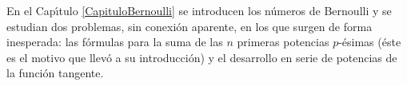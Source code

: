 En el Cap\'\i tulo \ref{CapituloBernoulli} se introducen los n\'umeros de Bernoulli y se estudian dos problemas, sin conexi\'on aparente, en los que surgen de forma inesperada: las f\'ormulas para la suma de las $n$ primeras potencias $p$-\'esimas (\'este es el motivo que llev\'o a su introducci\'on) y el desarrollo en serie de potencias de la funci\'on tangente.

